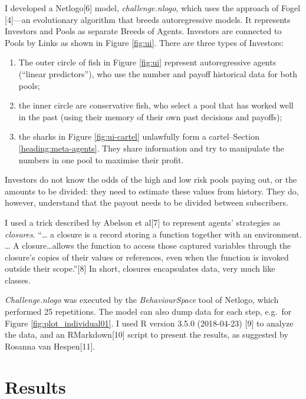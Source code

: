 \documentclass[]{article}
\providecommand{\tightlist}{%
  \setlength{\itemsep}{0pt}\setlength{\parskip}{0pt}}
\begin{document}
I developed a Netlogo{[}6{]} model, \emph{challenge.nlogo}, which uses
the approach of Fogel {[}4{]}---an evolutionary algorithm that breeds
autoregressive models. It represents Investors and Pools as separate
Breeds of Agents. Investors are connected to Pools by Links as shown in
Figure \ref{fig:ui}. There are three types of Investors:

\begin{enumerate}
\def\labelenumi{\arabic{enumi}.}
\tightlist
\item
  The outer circle of fish in Figure \ref{fig:ui} represent
  autoregressive agents (``linear predictors''), who use the number and
  payoff historical data for both pools;
\item
  the inner circle are conservative fish, who select a pool that has
  worked well in the past (using their memory of their own past
  decisions and payoffs);
\item
  the sharks in Figure \ref{fig:ui-cartel} unlawfully form a
  cartel--Section \ref{heading:meta-agents}. They share information and
  try to manipulate the numbers in one pool to maximise their profit.
\end{enumerate}

Investors do not know the odds of the high and low risk pools paying
out, or the amounts to be divided: they need to estimate these values
from history. They do, however, understand that the payout needs to be
divided between subscribers.

I used a trick described by Abelson et al{[}7{]} to represent agents'
strategies as \emph{closures}. ``\ldots{} a closure is a record storing
a function together with an environment. \ldots{} A
closure\ldots{}allows the function to access those captured variables
through the closure's copies of their values or references, even when
the function is invoked outside their scope.''{[}8{]} In short, closures
encapsulates data, very much like classes.

\emph{Challenge.nlogo} was executed by the \emph{BehaviourSpace} tool of
Netlogo, which performed 25 repetitions. The model can also dump data
for each step, e.g.~for Figure \ref{fig:plot_individual01}. I used R
version 3.5.0 (2018-04-23) {[}9{]} to analyze the data, and an
RMarkdown{[}10{]} script to present the results, as suggested by Rosanna
van Hespen{[}11{]}.

\section{Results}\label{results}
\end{document}
